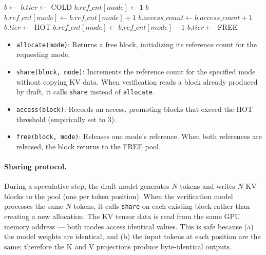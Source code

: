 \documentclass[review]{elsarticle}
\theoremstyle{definition}
\theoremstyle{remark}
\begin{document}
\begin{algorithm}[t]
\caption{Unified block pool operations.}
\label{alg:pool}
\begin{algorithmic}[1]
    \State $b \gets$ 
    \State $b.tier \gets$ COLD
    \State $b.ref\_cnt[mode] \gets 1$
    \State \Return $b$
\EndProcedure
\Statex
{}
    \State $b.ref\_cnt[mode] \gets b.ref\_cnt[mode] + 1$
\EndProcedure
\Statex
{}
    \State $b.access\_count \gets b.access\_count + 1$
        \State $b.tier \gets$ HOT
    \EndIf
\EndProcedure
\Statex
{}
    \State $b.ref\_cnt[mode] \gets b.ref\_cnt[mode] - 1$
        \State $b.tier \gets$ FREE
        \State {}
    \EndIf
\EndProcedure
\end{algorithmic}
\end{algorithm}

\begin{itemize}
    \item \texttt{allocate(mode)}: Returns a free block, initializing its
    reference count for the requesting mode.
    \item \texttt{share(block, mode)}: Increments the reference count for
    the specified mode without copying KV data. When verification reads a
    block already produced by draft, it calls \texttt{share} instead of
    \texttt{allocate}.
    \item \texttt{access(block)}: Records an access, promoting blocks
    that exceed the HOT threshold (empirically set to 3).
    \item \texttt{free(block, mode)}: Releases one mode's reference.
    When both references are released, the block returns to the FREE pool.
\end{itemize}

\paragraph{Sharing protocol.}
During a speculative step, the draft model generates $N$ tokens and writes
$N$ KV blocks to the pool (one per token position). When the verification
model processes the same $N$ tokens, it calls \texttt{share} on each
existing block rather than creating a new allocation. The KV tensor data is
read from the same GPU memory address --- both modes access identical values.
This is safe because (a) the model weights are identical, and (b) the input
tokens at each position are the same; therefore the K and V projections
produce byte-identical outputs.
\end{document}
